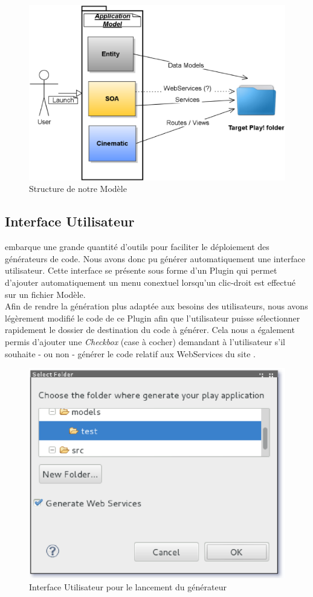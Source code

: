 \begin{figure}[htb]
  \centering
  \includegraphics[scale=0.4]{img/application_scheme.eps}
  \caption{Structure de notre Modèle }
  \label{fig:acceleo}
\end{figure}
\subsection{Interface Utilisateur}

\kwacceleo embarque une grande quantité d'outils pour faciliter le déploiement des générateurs de code. Nous avons donc pu générer automatiquement une interface utilisateur. Cette interface se présente sous forme d'un Plugin \kweclipse qui permet d'ajouter automatiquement un menu conextuel  lorsqu'un clic-droit est effectué sur un fichier Modèle.
\\
Afin de rendre la génération plus adaptée aux besoins des utilisateurs, nous avons légèrement modifié le code de ce Plugin afin que l'utilisateur puisse sélectionner rapidement le dossier de destination du code à générer. Cela nous a également permis d'ajouter une \textit{Checkbox} (case à cocher) demandant à l'utilisateur s'il souhaite - ou non - générer le code relatif aux WebServices du site \kwplay.

\begin{figure}[htb]
  \centering
  \includegraphics[scale=0.55]{img/screen_ui.eps}
  \caption{Interface Utilisateur pour le lancement du générateur}
  \label{fig:acceleo}
\end{figure}